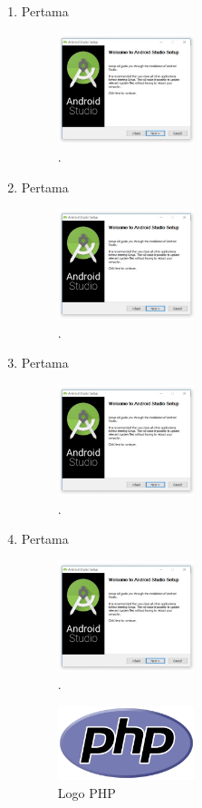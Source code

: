 \begin{enumerate}
	\item Pertama
	\begin{figure}[H]
		\includegraphics[width=4cm]{figures/installas/1.jpg}
		\centering
		\caption{.}
	\end{figure}
	
	\item Pertama
	\begin{figure}[H]
		\includegraphics[width=4cm]{figures/installas/1.jpg}
		\centering
		\caption{.}
	\end{figure}
	
	\item Pertama
	\begin{figure}[H]
		\includegraphics[width=4cm]{figures/installas/1.jpg}
		\centering
		\caption{.}
	\end{figure}
	
	\item Pertama
	\begin{figure}[H]
		\includegraphics[width=4cm]{figures/installas/1.jpg}
		\centering
		\caption{.}
	\end{figure}
	\begin{figure}[H]
		\includegraphics[width=4cm]{figures/web/php.png}
		\centering
		\caption{Logo PHP}
	\end{figure}



\end{enumerate}
